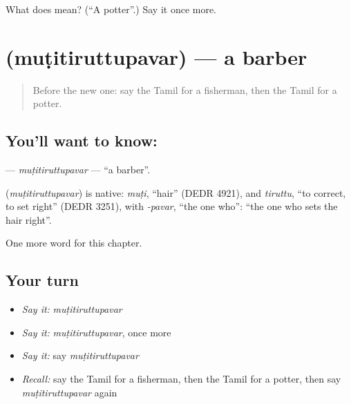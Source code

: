 \begin{tcolorbox}[breakable,colback=teal!4,colframe=teal!35!black,title={Before you move on}]
What does  mean? (\textquotedblleft{}A potter\textquotedblright{}.) Say it once more.
\end{tcolorbox}
\section[\texorpdfstring{\ta{முடிதிருத்துபவர்} (muṭitiruttupavar)}{முடிதிருத்துபவர் (muṭitiruttupavar)}]{ (muṭitiruttupavar) — a barber}

\label{lesson:TA-C224-mutitiruttupavar}



\begin{quote}
Before the new one: say the Tamil for a fisherman, then the Tamil for a potter.
\end{quote}

\subsection*{You'll want to know: }
\textbf{} — \emph{muṭitiruttupavar} — \textquotedblleft{}a barber\textquotedblright{}.

\begin{cousinweb}
\textbf{} (\emph{muṭitiruttupavar}) is native: \emph{muṭi}, \textquotedblleft{}hair\textquotedblright{} (DEDR 4921), and \emph{tiruttu}, \textquotedblleft{}to correct, to set right\textquotedblright{} (DEDR 3251), with \emph{-pavar}, \textquotedblleft{}the one who\textquotedblright{}: \textquotedblleft{}the one who sets the hair right\textquotedblright{}.
\end{cousinweb}

\begin{grammarlens}[title={What you've built}]
One more word for this chapter.
\end{grammarlens}

\subsection*{Your turn}
\begin{itemize}
\raggedright
  \item \emph{Say it:} \emph{muṭitiruttupavar}
  \item \emph{Say it:} \emph{muṭitiruttupavar}, once more
  \item \emph{Say it:} say \emph{muṭitiruttupavar}
  \item \emph{Recall:} say the Tamil for a fisherman, then the Tamil for a potter, then say \emph{muṭitiruttupavar} again
\end{itemize}

